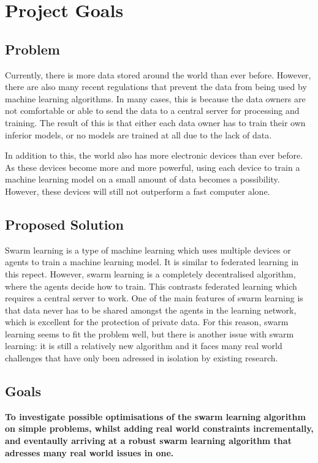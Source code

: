 \chapter{Project Goals}
\section{Problem}
Currently, there is more data stored around the world than ever before. However, there are also many recent regulations that prevent the data from being used by machine learning algorithms. In many cases, this is because the data owners are not comfortable or able to send the data to a central server for processing and training. The result of this is that either each data owner has to train their own inferior models, or no models are trained at all due to the lack of data.

In addition to this, the world also has more electronic devices than ever before. As these devices become more and more powerful, using each device to train a machine learning model on a small amount of data becomes a possibility. However, these devices will still not outperform a fast computer alone.

\section{Proposed Solution}
Swarm learning is a type of machine learning which uses multiple devices or agents to train a machine learning model. It is similar to federated learning in this repect. However, swarm learning is a completely decentralised algorithm, where the agents decide how to train. This contrasts federated learning which requires a central server to work. One of the main features of swarm learning is that data never has to be shared amongst the agents in the learning network, which is excellent for the protection of private data. For this reason, swarm learning seems to fit the problem well, but there is another issue with swarm learning: it is still a relatively new algorithm and it faces many real world challenges that have only been adressed in isolation by existing research.

\section{Goals}
\textbf{To investigate possible optimisations of the swarm learning algorithm on simple problems, whilst adding real world constraints incrementally, and eventaully arriving at a robust swarm learning algorithm that adresses many real world issues in one.}

